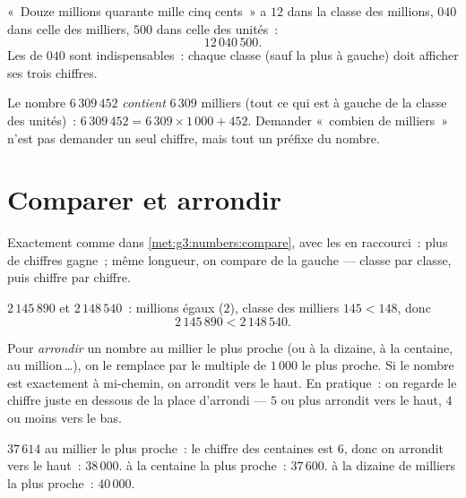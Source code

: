 \begin{example}\label{ex:g4:numbers:write}
«~Douze millions quarante mille cinq cents~» a $12$ dans la
classe des millions, $040$ dans celle des milliers, $500$ dans celle
des unités~:
\[
12\,040\,500 .
\]
Les  de $040$ sont indispensables~: chaque classe (sauf la plus
à gauche) doit afficher ses trois chiffres.
\end{example}

\begin{example}\label{ex:g4:numbers:contained}
Le nombre $6\,309\,452$ \emph{contient} $6\,309$ milliers
(tout ce qui est à gauche de la classe des unités)~:
$6\,309\,452 = 6\,309 \times 1\,000 + 452$. Demander «~combien de
milliers~» n'est pas demander un seul chiffre, mais tout un préfixe
du nombre.
\end{example}

\section{Comparer et arrondir}

\begin{method}\label{met:g4:numbers:compare}
Exactement comme dans \cref{met:g3:numbers:compare}, avec les 
en raccourci~: plus de chiffres gagne~; même longueur, on compare de
la gauche --- classe par classe, puis chiffre par chiffre.
\end{method}

\begin{example}\label{ex:g4:numbers:compare}
$2\,145\,890$ et $2\,148\,540$~: millions égaux ($2$), classe des
milliers $145 < 148$, donc
\[
2\,145\,890 < 2\,148\,540 .
\]
\end{example}

\begin{definition}[Arrondi]\label{def:g4:numbers:round}
Pour \emph{arrondir} un nombre au millier le plus
proche (ou à la dizaine, à la centaine, au million\,\dots), on le
remplace par le multiple de $1\,000$ le plus proche. Si le nombre est
exactement à mi-chemin, on arrondit vers le haut. En pratique~: on
regarde le chiffre juste en dessous de la place d'arrondi --- $5$ ou
plus arrondit vers le haut, $4$ ou moins vers le bas.
\end{definition}

\begin{example}\label{ex:g4:numbers:round}
$37\,614$  au millier le plus proche~: le chiffre des
centaines est $6$, donc on arrondit vers le haut~: $38\,000$. 
à la centaine la plus proche~: $37\,600$.  à la dizaine de
milliers la plus proche~: $40\,000$.
\end{example}

